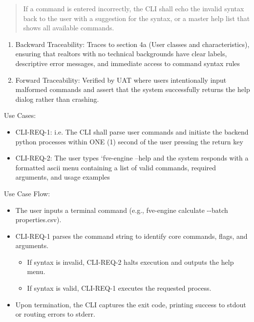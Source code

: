 \documentclass[
]{article}
\begin{document}
\begin{quote}
If a command is entered incorrectly, the CLI shall echo the invalid
syntax back to the user with a suggestion for the syntax, or a master
help list that shows all available commands.
\end{quote}

\begin{enumerate}
\def\labelenumi{\alph{enumi}.}
\setcounter{enumi}{1}
\item
  Backward Traceability: Traces to section 4a (User classes and
  characteristics), ensuring that realtors with no technical backgrounds
  have clear labels, descriptive error messages, and immediate access to
  command syntax rules
\item
  Forward Traceability: Verified by UAT where users intentionally input
  malformed commands and assert that the system successfully returns the
  help dialog rather than crashing.
\end{enumerate}

Use Cases:

\begin{itemize}
\item
  CLI-REQ-1: i.e. The CLI shall parse user commands and initiate the
  backend python processes within ONE (1) second of the user pressing
  the return key
\item
  CLI-REQ-2: The user types `fve-engine --help\textquotesingle{} and the
  system responds with a formatted ascii menu containing a list of valid
  commands, required arguments, and usage examples
\end{itemize}

Use Case Flow:

\begin{itemize}
\item
  The user inputs a terminal command (e.g., fve-engine calculate
  -\/-batch properties.csv).
\item
  CLI-REQ-1 parses the command string to identify core commands, flags,
  and arguments.

  \begin{itemize}
  \item
    If syntax is invalid, CLI-REQ-2 halts execution and outputs the help
    menu.
  \item
    If syntax is valid, CLI-REQ-1 executes the requested process.
  \end{itemize}
\item
  Upon termination, the CLI captures the exit code, printing success to
  stdout or routing errors to stderr.
\end{itemize}
\end{document}
